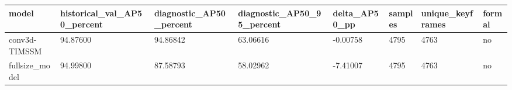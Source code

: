 \begin{tabular}{llllllll}
\hline
model & historical\_val\_AP50\_percent & diagnostic\_AP50\_percent & diagnostic\_AP50\_95\_percent & delta\_AP50\_pp & samples & unique\_keyframes & formal \\
\hline
conv3d-TIMSSM & 94.87600 & 94.86842 & 63.06616 & -0.00758 & 4795 & 4763 & no \\
fullsize\_model & 94.99800 & 87.58793 & 58.02962 & -7.41007 & 4795 & 4763 & no \\
\hline
\end{tabular}

